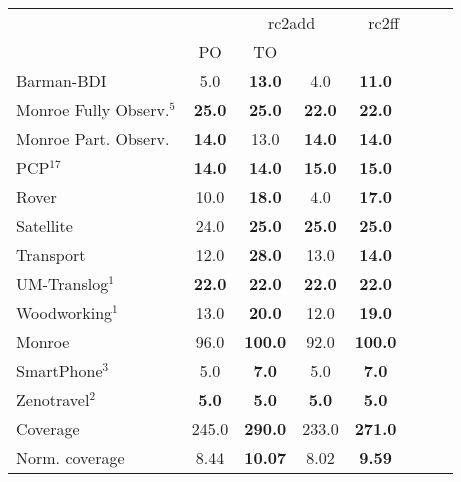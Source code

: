 \begin{tabular}{lccccccl} 
\toprule 
  && \multicolumn{2}{c}{rc2add} & \multicolumn{2}{c}{rc2ff} \\ 
\cmidrule(lr){3-4} \cmidrule(lr){5-6}  
 &PO & TO  \\ 
\midrule 
Barman-BDI & 5.0 & \textbf{13.0} & 4.0 & \textbf{11.0}  \\ 
Monroe Fully Observ.$^{5}$ & \textbf{25.0} & \textbf{25.0} & \textbf{22.0} & \textbf{22.0}  \\ 
Monroe Part. Observ. & \textbf{14.0} & 13.0 & \textbf{14.0} & \textbf{14.0}  \\ 
PCP$^{17}$ & \textbf{14.0} & \textbf{14.0} & \textbf{15.0} & \textbf{15.0}  \\ 
Rover & 10.0 & \textbf{18.0} & 4.0 & \textbf{17.0}  \\ 
Satellite & 24.0 & \textbf{25.0} & \textbf{25.0} & \textbf{25.0}  \\ 
Transport & 12.0 & \textbf{28.0} & 13.0 & \textbf{14.0}  \\ 
UM-Translog$^{1}$ & \textbf{22.0} & \textbf{22.0} & \textbf{22.0} & \textbf{22.0}  \\ 
Woodworking$^{1}$ & 13.0 & \textbf{20.0} & 12.0 & \textbf{19.0}  \\ 
\midrule 
 Monroe & 96.0 & \textbf{100.0} & 92.0 & \textbf{100.0}  \\ 
SmartPhone$^{3}$ & 5.0 & \textbf{7.0} & 5.0 & \textbf{7.0}  \\ 
Zenotravel$^{2}$ & \textbf{5.0} & \textbf{5.0} & \textbf{5.0} & \textbf{5.0}  \\ 
\midrule 
 Coverage & 245.0 & \textbf{290.0} & 233.0 & \textbf{271.0}  \\ 
Norm. coverage & 8.44 & \textbf{10.07} & 8.02 & \textbf{9.59}  \\ 
\bottomrule 
 \end{tabular} 
